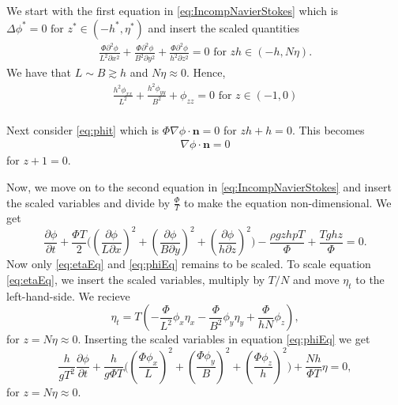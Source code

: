 \documentclass[11pt]{article}
\begin{document}
We start with the first equation in \eqref{eq:IncompNavierStokes} which is $\Delta \phi^* = 0 \text{ for } z^* \in(-h^*, \eta^*)$ and insert the scaled quantities
\begin{align*}
\frac{\Phi\partial^2\phi}{L^2\partial x^{2}} +  \frac{\Phi\partial^2\phi}{B^2\partial y^{2}} + \frac{\Phi\partial^2\phi}{h^2\partial z^{2}} = 0 \text{ for } zh \in(-h, N\eta).
\end{align*}
We have that $L \sim B \gtrsim h$ and $N\eta \approx 0$. Hence,
\begin{equation}\label{2.8a scaled}
\begin{aligned}
\frac{h^2\phi_{xx}}{L^2} + \frac{h^2\phi_{yy}}{B^2} + \phi_{zz} = 0 \text{ for } z \in(-1,0) \\
\end{aligned}
\end{equation}


Next consider \eqref{eq:phit} which is $
\Phi \nabla \phi \cdot \bm{n} = 0 $ for $ zh + h = 0$. This becomes
\begin{align}\label{2.9a scaled}
\nabla \phi \cdot \bm{n} = 0
\end{align}
for $z +1 = 0$.


Now, we move on to the second equation in \eqref{eq:IncompNavierStokes} and insert the scaled variables and divide by $\frac{\Phi}{T}$ to make the equation non-dimensional. We get
\begin{equation*}
\frac{\partial \phi}{\partial t} + \frac{\Phi T}{2}\Big((\frac{\partial \phi}{L\partial x})^2 + (\frac{\partial\phi}{B\partial y})^2 + (\frac{\partial \phi}{h\partial z})^2\Big) - \frac{\rho g z h p T }{\Phi} + \frac{Tghz}{\Phi} = 0.
\end{equation*}
Now only \eqref{eq:etaEq} and \eqref{eq:phiEq} remains to be scaled. %
To scale equation \eqref{eq:etaEq}, we insert the scaled variables, multiply by $T/N$ and move $\eta_t$ to the left-hand-side. We recieve
\begin{equation} \label{etat}
 \eta_t = T (-\frac{\Phi}{L^2} \phi_x  \eta_x - \frac{\Phi}{B^2} \phi_y \eta_y + \frac{\Phi}{hN} \phi_z ),
\end{equation}
for $z = N\eta \approx 0$.
Inserting the scaled variables in equation \eqref{eq:phiEq} we get
\begin{equation} \label{eq13}
\frac{ h}{g T^2 } \frac{\partial \phi }{\partial t} + \frac{h}{g\Phi T}\Big((\frac{\Phi \phi_x}{L})^2+(\frac{\Phi \phi_y}{B})^2+(\frac{\Phi \phi_z}{h})^2\Big) + \frac{Nh}{\Phi T}\eta = 0,
\end{equation}
for $z = N\eta \approx 0$.
\end{document}
